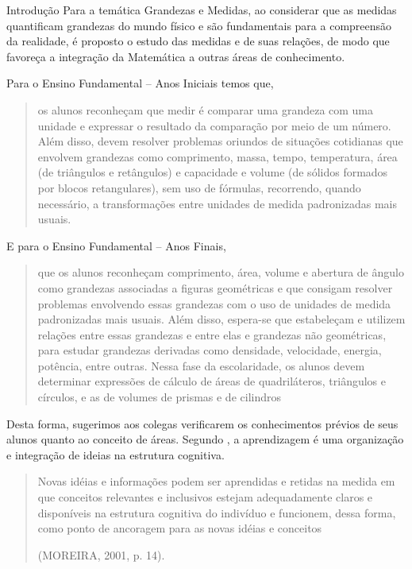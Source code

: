 \begin{apresentacao}{Introdução}
Para a temática Grandezas e Medidas, ao considerar que as medidas quantificam grandezas do mundo físico e são fundamentais para a compreensão da realidade, é proposto o estudo das medidas e de suas relações, de modo que favoreça a integração da Matemática a outras áreas de conhecimento.

Para o Ensino Fundamental -- Anos Iniciais temos que,
  \begin{quote}
  os alunos reconheçam que medir é comparar uma grandeza com uma unidade e expressar o resultado da comparação por meio de um número. Além disso, devem resolver problemas oriundos de situações cotidianas que envolvem grandezas como comprimento, massa, tempo, temperatura, área (de triângulos e retângulos) e capacidade e volume (de sólidos formados por blocos retangulares), sem uso de fórmulas, recorrendo, quando necessário, a transformações entre unidades de medida padronizadas mais usuais. \citep[p. 273]{BNCC2019}
  \end{quote}

E para o Ensino Fundamental --  Anos Finais,
  \begin{quote}
  que os alunos reconheçam comprimento, área, volume e abertura de ângulo como grandezas associadas a figuras geométricas e que consigam resolver problemas envolvendo essas grandezas com o uso de unidades de medida padronizadas mais usuais. Além disso, espera-se que estabeleçam e utilizem relações entre essas grandezas e entre elas e grandezas não geométricas, para estudar grandezas derivadas como densidade, velocidade, energia, potência, entre outras. Nessa fase da escolaridade, os alunos devem determinar expressões de cálculo de áreas de quadriláteros, triângulos e círculos, e as de volumes de prismas e de cilindros \citep[p. 273]{BNCC2019}
  \end{quote}

  Desta forma, sugerimos aos colegas verificarem os conhecimentos prévios de seus alunos quanto ao conceito de áreas. Segundo  \citealp*[Ausubel (1968) apud][]{moreira2011}, a aprendizagem é uma organização e integração de ideias na estrutura cognitiva. 
  \begin{quote}
  Novas idéias e informações podem ser aprendidas e retidas na medida em que conceitos relevantes e inclusivos estejam adequadamente claros e disponíveis na estrutura cognitiva do indivíduo e funcionem, dessa forma, como ponto de ancoragem para as novas idéias e conceitos 

  \flushright
  (MOREIRA, 2001, p. 14).
  \end{quote}


\end{apresentacao}

